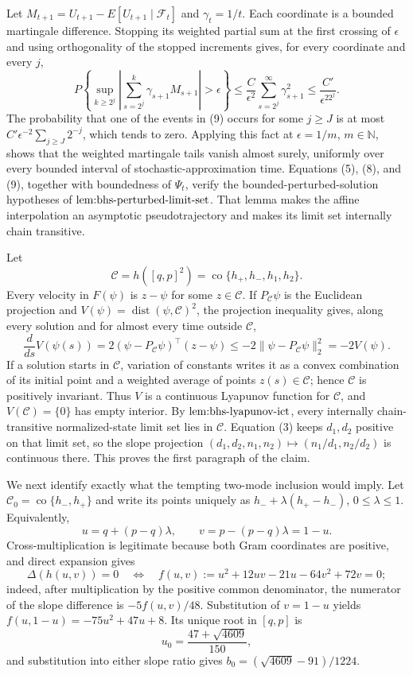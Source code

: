 Let \(M_{t+1}=U_{t+1}-E[U_{t+1}\mid\mathcal F_t]\) and \(\gamma_t=1/t\). Each coordinate is a bounded martingale difference. Stopping its weighted partial sum at the first crossing of \(\epsilon\) and using orthogonality of the stopped increments gives, for every coordinate and every \(j\),
\[
 P\left\{\sup_{k\geq2^j}\left|\sum_{s=2^j}^k\gamma_{s+1}M_{s+1}\right|>\epsilon\right\}
 \leq \frac{C}{\epsilon^2}\sum_{s=2^j}^{\infty}\gamma_{s+1}^2
 \leq\frac{C'}{\epsilon^22^j}. \tag{9}
\]
The probability that one of the events in (9) occurs for some \(j\geq J\) is at most \(C'\epsilon^{-2}\sum_{j\geq J}2^{-j}\), which tends to zero. Applying this fact at \(\epsilon=1/m\), \(m\in\mathbb N\), shows that the weighted martingale tails vanish almost surely, uniformly over every bounded interval of stochastic-approximation time. Equations (5), (8), and (9), together with boundedness of \(\Psi_t\), verify the bounded-perturbed-solution hypotheses of \(\textnormal{lem:bhs-perturbed-limit-set}\). That lemma makes the affine interpolation an asymptotic pseudotrajectory and makes its limit set internally chain transitive.

Let
\[
 \mathcal C=h([q,p]^2)=\operatorname{co}\{h_+,h_-,h_1,h_2\}.
\]
Every velocity in \(F(\psi)\) is \(z-\psi\) for some \(z\in\mathcal C\). If \(P_{\mathcal C}\psi\) is the Euclidean projection and \(V(\psi)=\operatorname{dist}(\psi,\mathcal C)^2\), the projection inequality gives, along every solution and for almost every time outside \(\mathcal C\),
\[
 \frac{d}{ds}V(\psi(s))
 =2(\psi-P_{\mathcal C}\psi)^\top(z-\psi)
 \leq-2\|\psi-P_{\mathcal C}\psi\|_2^2=-2V(\psi). \tag{10}
\]
If a solution starts in \(\mathcal C\), variation of constants writes it as a convex combination of its initial point and a weighted average of points \(z(s)\in\mathcal C\); hence \(\mathcal C\) is positively invariant. Thus \(V\) is a continuous Lyapunov function for \(\mathcal C\), and \(V(\mathcal C)=\{0\}\) has empty interior. By \(\textnormal{lem:bhs-lyapunov-ict}\), every internally chain-transitive normalized-state limit set lies in \(\mathcal C\). Equation (3) keeps \(d_1,d_2\) positive on that limit set, so the slope projection \((d_1,d_2,n_1,n_2)\mapsto(n_1/d_1,n_2/d_2)\) is continuous there. This proves the first paragraph of the claim.

We next identify exactly what the tempting two-mode inclusion would imply. Let \(\mathcal C_0=\operatorname{co}\{h_-,h_+\}\) and write its points uniquely as \(h_-+\lambda(h_+-h_-)\), \(0\leq\lambda\leq1\). Equivalently,
\[
 u=q+(p-q)\lambda,\qquad v=p-(p-q)\lambda=1-u. \tag{11}
\]
Cross-multiplication is legitimate because both Gram coordinates are positive, and direct expansion gives
\[
 \Delta(h(u,v))=0
 \quad\Longleftrightarrow\quad
 f(u,v):=u^2+12uv-21u-64v^2+72v=0; \tag{12}
\]
indeed, after multiplication by the positive common denominator, the numerator of the slope difference is \(-5f(u,v)/48\). Substitution of \(v=1-u\) yields \(f(u,1-u)=-75u^2+47u+8\). Its unique root in \([q,p]\) is
\[
 u_0=\frac{47+\sqrt{4609}}{150},
\]
and substitution into either slope ratio gives \(b_0=(\sqrt{4609}-91)/1224\).

